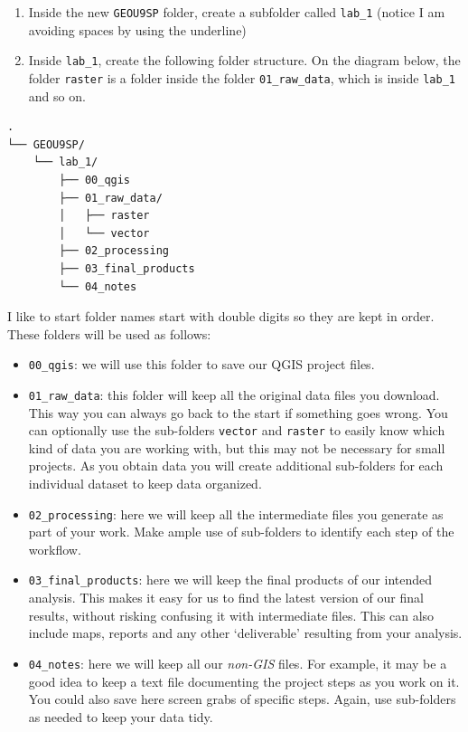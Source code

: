 \documentclass[
  letterpaper,
  DIV=11,
  numbers=noendperiod]{scrreprt}
\begin{document}
\begin{enumerate}
\def\labelenumi{(\arabic{enumi})}
\setcounter{enumi}{4}
\item
  Inside the new \texttt{GEOU9SP} folder, create a subfolder called
  \texttt{lab\_1} (notice I am avoiding spaces by using the underline)
\item
  Inside \texttt{lab\_1}, create the following folder structure. On the
  diagram below, the folder \texttt{raster} is a folder inside the
  folder \texttt{01\_raw\_data}, which is inside \texttt{lab\_1} and so
  on.
\end{enumerate}

\begin{verbatim}
.
└── GEOU9SP/
    └── lab_1/
        ├── 00_qgis
        ├── 01_raw_data/
        │   ├── raster
        │   └── vector
        ├── 02_processing
        ├── 03_final_products
        └── 04_notes
\end{verbatim}

I like to start folder names start with double digits so they are kept
in order. These folders will be used as follows:

\begin{itemize}
\item
  \texttt{00\_qgis}: we will use this folder to save our QGIS project
  files.
\item
  \texttt{01\_raw\_data}: this folder will keep all the original data
  files you download. This way you can always go back to the start if
  something goes wrong. You can optionally use the sub-folders
  \texttt{vector} and \texttt{raster} to easily know which kind of data
  you are working with, but this may not be necessary for small
  projects. As you obtain data you will create additional sub-folders
  for each individual dataset to keep data organized.
\item
  \texttt{02\_processing}: here we will keep all the intermediate files
  you generate as part of your work. Make ample use of sub-folders to
  identify each step of the workflow.
\item
  \texttt{03\_final\_products}: here we will keep the final products of
  our intended analysis. This makes it easy for us to find the latest
  version of our final results, without risking confusing it with
  intermediate files. This can also include maps, reports and any other
  `deliverable' resulting from your analysis.
\item
  \texttt{04\_notes}: here we will keep all our \emph{non-GIS} files.
  For example, it may be a good idea to keep a text file documenting the
  project steps as you work on it. You could also save here screen grabs
  of specific steps. Again, use sub-folders as needed to keep your data
  tidy.
\end{itemize}
\end{document}
